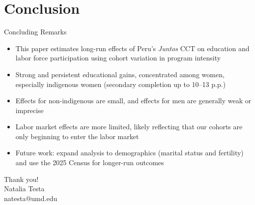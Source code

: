 \documentclass[aspectratio=169,usenames,dvipsnames]{beamer}
\begin{document}
\section{Conclusion}
\begin{frame}{Concluding Remarks}
\small
\begin{itemize}
    \item This paper estimates long-run effects of Peru's \textit{Juntos} CCT on education and labor force participation using cohort variation in program intensity

    \item Strong and persistent educational gains, concentrated among women, especially indigenous women (secondary completion up to 10--13 p.p.)

    \item Effects for non-indigenous are small, and effects for men are generally weak or imprecise

    \item Labor market effects are more limited, likely reflecting that our cohorts are only beginning to enter the labor market

    \item Future work: expand analysis to demographics (marital status and fertility) and use the 2025 Census for longer-run outcomes
\end{itemize}
\end{frame}


\begin{frame}
\begin{center}
\Huge{\color{Blue}Thank you!} \\
\small{Natalia Testa \\
natesta@umd.edu}
\end{center}
\end{frame}
\end{document}
